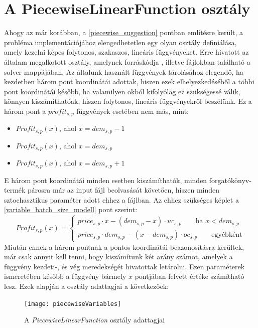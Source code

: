 \section{A PiecewiseLinearFunction osztály} \label{piecewise_class}
Ahogy az már korábban, a \ref{piecewise_suggestion} pontban említésre került, a probléma implementációjához elengedhetetlen egy olyan osztály definiálása, amely kezelni képes folytonos, szakaszos, lineáris függvényeket.
Erre hivatott az általam megalkotott  osztály, amelynek forráskódja , illetve  fájlokban található a solver  mappájában.
Az általunk használt függvények tárolásához elegendő, ha kezdetben három pont koordinátái adottak, hiszen ezek elhelyezkedéséből a többi pont koordinátái később, ha valamilyen okból kifolyólag ez szükségessé válik, könnyen kiszámíthatóak, hiszen folytonos, lineáris függvényekről beszélünk.
Ez a három pont a $profit_{s,p}$ függvények esetében nem más, mint: 
\begin{itemize}
\item $Profit_{s,p}(x)$\quad, ahol $x=dem_{s,p}-1$
\item $Profit_{s,p}(x)$\quad, ahol $x=dem_{s,p}$
\item $Profit_{s,p}(x)$\quad, ahol $x=dem_{s,p}+1$
\end{itemize} 
E három pont koordinátái minden esetben kiszámíthatók, minden forgatókönyv-termék párosra már az input fájl beolvasását követően, hiszen minden sztochasztikus paraméter adott ehhez a fájlban.
Az ehhez szükséges képlet a \ref{variable_batch_size_modell} pont szerint:
\begin{equation*}
Profit_{s,p}(x)= \begin{cases}
            price_{s,p}\cdot x-(dem_{s,p}-x) \cdot uc_{s,p}\qquad \text{ha } x<dem_{s,p} \\
            price_{s,p} \cdot dem_{s,p}-(x-dem_{s,p}) \cdot oc_{s,p}\qquad \text{egyébként}
       \end{cases}
\end{equation*}
Miután ennek a három pontnak a pontos koordinátái beazonosításra kerültek, már csak annyit kell tenni, hogy kiszámítunk két arány számot, amelyek a függvény kezdeti-, és vég meredekségét hivatottak letárolni.
Ezen paraméterek ismeretében később a függvény bármely $x$ pontjában felvett értéke számítható lesz.
Ezek alapján a  osztály adattagjai a következőek:
\begin{figure}[H]
\begin{center}
\texttt{[image: piecewiseVariables]}
\caption{A \textit{PiecewiseLinearFunction} osztály adattagjai}
\label{piecewise_variables}
\end{center}
\end{figure} 
